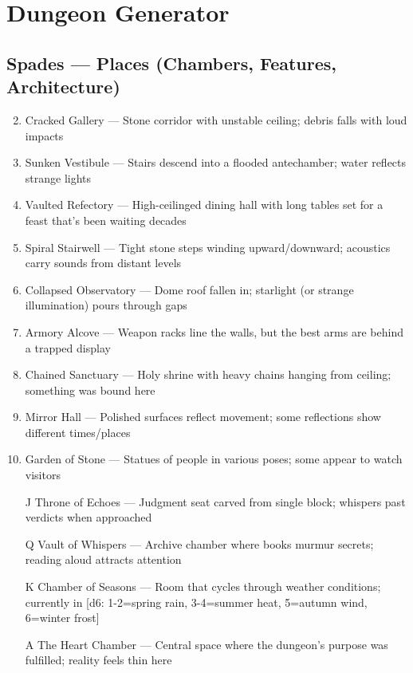 \chapter{Dungeon Generator}

\section*{Spades --- Places (Chambers, Features, Architecture)}
\begin{enumerate}
\setcounter{enumi}{1}
\item Cracked Gallery --- Stone corridor with unstable ceiling; debris falls with loud impacts
\item Sunken Vestibule --- Stairs descend into a flooded antechamber; water reflects strange lights
\item Vaulted Refectory --- High-ceilinged dining hall with long tables set for a feast that's been waiting decades
\item Spiral Stairwell --- Tight stone steps winding upward/downward; acoustics carry sounds from distant levels
\item Collapsed Observatory --- Dome roof fallen in; starlight (or strange illumination) pours through gaps
\item Armory Alcove --- Weapon racks line the walls, but the best arms are behind a trapped display
\item Chained Sanctuary --- Holy shrine with heavy chains hanging from ceiling; something was bound here
\item Mirror Hall --- Polished surfaces reflect movement; some reflections show different times/places
\item Garden of Stone --- Statues of people in various poses; some appear to watch visitors
\item[J] Throne of Echoes --- Judgment seat carved from single block; whispers past verdicts when approached
\item[Q] Vault of Whispers --- Archive chamber where books murmur secrets; reading aloud attracts attention
\item[K] Chamber of Seasons --- Room that cycles through weather conditions; currently in [d6: 1-2=spring rain, 3-4=summer heat, 5=autumn wind, 6=winter frost]
\item[A] The Heart Chamber --- Central space where the dungeon's purpose was fulfilled; reality feels thin here
\end{enumerate}

